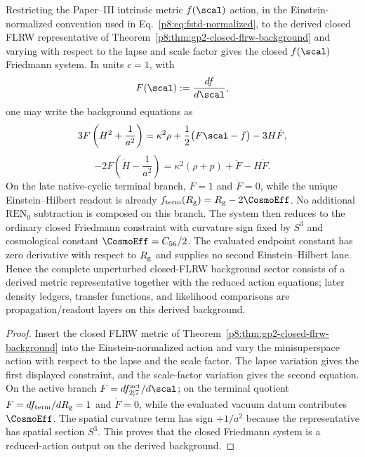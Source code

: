 \documentclass[12pt,a4paper]{article}
\begin{document}
\begin{corollary}
\label{p8:cor:closed-flrw-friedmann-derived}
Restricting the Paper--III intrinsic metric \(f(\scal)\) action, in the Einstein-normalized convention used in Eq.~\eqref{p8:eq:fstd-normalized}, to the derived closed FLRW representative of Theorem~\ref{p8:thm:gp2-closed-flrw-background} and varying with respect to the lapse and scale factor gives the closed \(f(\scal)\) Friedmann system.  In units \(c=1\), with
\[
F(\scal):=\frac{df}{d\scal},
\]
one may write the background equations as
\[
3F\left(H^2+\frac{1}{a^2}\right)
=\kappa^2\rho+\frac12\bigl(F\scal-f\bigr)-3H\dot F,
\]
\[
-2F\left(\dot H-\frac{1}{a^2}\right)
=\kappa^2(\rho+p)+\ddot F-H\dot F.
\]
On the late native-cyclic terminal branch, \(F=1\) and \(\dot F=0\),
while the unique Einstein--Hilbert readout is already
\(f_{\rm term}(R_{\rm g})=R_{\rm g}-2\CosmoEff\).  No additional
\(\mathrm{REN}_0\) subtraction is composed on this branch.  The system then
reduces to the ordinary closed Friedmann constraint with curvature sign fixed
by \(S^3\) and cosmological constant \(\CosmoEff=C_{56}/2\).  The evaluated endpoint constant has zero
derivative with respect to \(R_{\rm g}\) and supplies no second
Einstein--Hilbert lane.  Hence the complete unperturbed closed-FLRW background
sector consists of a derived metric representative together with the reduced
action equations; later density ledgers, transfer functions, and likelihood
comparisons are propagation/readout layers on this derived background.
\end{corollary}

\begin{proof}
Insert the closed FLRW metric of Theorem~\ref{p8:thm:gp2-closed-flrw-background} into the Einstein-normalized action and vary the minisuperspace action with respect to the lapse and the scale factor.  The lapse variation gives the first displayed constraint, and the scale-factor variation gives the second equation.  On the active branch \(F=df_{2\mid7}^{\rm act}/d\scal\); on the terminal quotient \(F=df_{\rm term}/dR_{\rm g}=1\) and \(\dot F=0\), while the evaluated vacuum datum contributes \(\CosmoEff\).  The spatial curvature term has sign \(+1/a^2\) because the representative has spatial section \(S^3\).  This proves that the closed Friedmann system is a reduced-action output on the derived background.
\end{proof}
\end{document}
